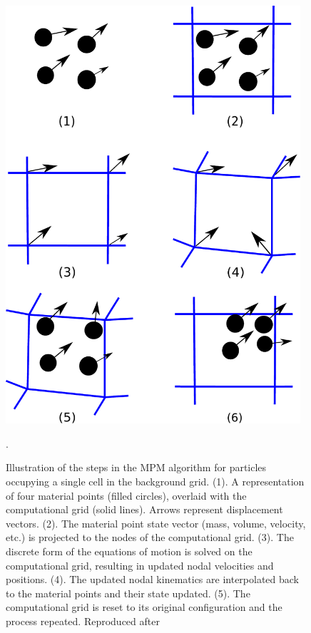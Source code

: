 \begin{figure}[htbp]
\centering
\includegraphics[width=0.975\textwidth]{MPMsteps}
\caption[Illustration of the MPM algorithm for particles occupying a single 
cell in the background grid]{Illustration of the steps in the MPM algorithm for 
particles occupying a single cell in the background grid. (1). A representation 
of four material points (filled circles), overlaid with the computational grid 
(solid lines). Arrows represent displacement vectors. (2). The material point 
state vector (mass, volume, velocity, etc.) is projected to the nodes of the 
computational grid. (3). The discrete form of the equations of motion is solved 
on the computational grid, resulting in updated nodal velocities and positions. 
(4). The updated nodal kinematics are interpolated back to the material points 
and their state updated. (5). The computational grid is reset to its original 
configuration and the process repeated. Reproduced after~\citet{bigler2006}}. 
\label{fig:MPMsteps}
\end{figure}

